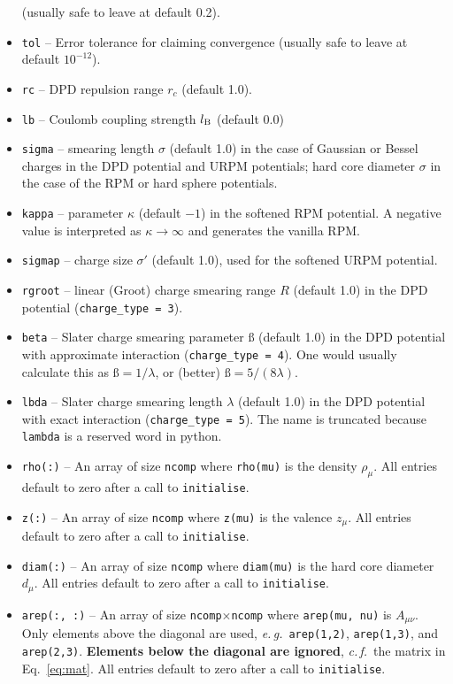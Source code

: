 \documentclass[12pt,a4paper]{article}
\newcommand{\latin}[1]{\emph{#1}}
\newcommand{\eg}{\latin{e.\,g.}}
\newcommand{\cf}{\latin{c.\,f.}}
\newcommand{\varbeta}{\text{\ss}}
\newcommand{\Eqref}[1]{Eq.~\eqref{#1}}
\begin{document}
\begin{itemize}
  (usually safe to leave at default 0.2).
%
\item\verb+tol+ -- Error tolerance for claiming convergence (usually
  safe to leave at default $10^{-12}$).
%
\item\verb+rc+ -- DPD repulsion range $r_c$ (default 1.0).
%
\item\verb+lb+ -- Coulomb coupling strength $l_{\mathrm{B}}$ (default 0.0)
%
\item\verb+sigma+ -- smearing length $\sigma$ (default 1.0) in the
  case of Gaussian or Bessel charges in the DPD potential and URPM
  potentials; hard core diameter $\sigma$ in the case of the RPM or
  hard sphere potentials.
%
\item\verb+kappa+ -- parameter $\kappa$ (default $-1$) in the
  softened RPM potential.  A negative value is interpreted as
  $\kappa\to\infty$ and generates the vanilla RPM.
%
\item\verb+sigmap+ -- charge size $\sigma'$ (default 1.0), used for
  the softened URPM potential.
%
\item\verb+rgroot+ -- linear (Groot) charge smearing range $R$
  (default 1.0) in the DPD potential (\verb+charge_type = 3+).
%
\item\verb+beta+ -- Slater charge smearing parameter $\varbeta$
  (default 1.0) in the DPD potential with approximate interaction
  (\verb+charge_type = 4+).  One would usually calculate this as
  $\varbeta=1/\lambda$, or (better) $\varbeta=5/(8\lambda)$.
%
\item\verb+lbda+ -- Slater charge smearing length $\lambda$ (default
  1.0) in the DPD potential with exact interaction
  (\verb+charge_type = 5+).  The name is truncated because
  \verb+lambda+ is a reserved word in python.
%
\item\verb+rho(:)+ -- An array of size \verb+ncomp+ where
  \verb+rho(mu)+ is the density $\rho_\mu$.  All entries default to
  zero after a call to \verb+initialise+.
%
\item\verb+z(:)+ -- An array of size \verb+ncomp+ where
  \verb+z(mu)+ is the valence $z_\mu$.  All entries default to
  zero after a call to \verb+initialise+.
%
\item\verb+diam(:)+ -- An array of size \verb+ncomp+ where
  \verb+diam(mu)+ is the hard core diameter $d_\mu$.  All entries
  default to zero after a call to \verb+initialise+.
%
\item\verb+arep(:, :)+ -- An array of size
  \verb+ncomp+$\times$\verb+ncomp+ where \verb+arep(mu, nu)+ is
  $A_{\mu\nu}$.  Only elements above the diagonal are used,
  \eg\ \verb+arep(1,2)+, \verb+arep(1,3)+, and \verb+arep(2,3)+.  {\bf
    Elements below the diagonal are ignored}, \cf\ the matrix in
  \Eqref{eq:mat}.  All entries default to zero after a call to
  \verb+initialise+.
%
\end{itemize}
\end{document}
